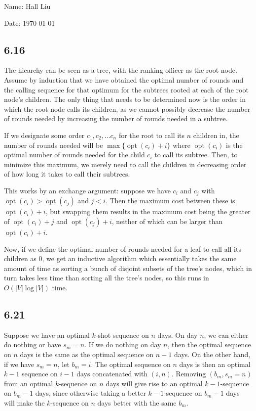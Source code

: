 \documentclass{article}
\DeclareMathOperator{\opt}{opt}
\begin{document}
Name: Hall Liu

Date: \today 
\vspace{1.5cm}
\subsection*{6.16}
The hiearchy can be seen as a tree, with the ranking officer as the root node. Assume by induction that we have obtained the optimal number of rounds and the calling sequence for that optimum for the subtrees rooted at each of the root node's children. The only thing that needs to be determined now is the order in which the root node calls its children, as we cannot possibly decrease the number of rounds needed by increasing the number of rounds needed in a subtree. 

If we designate some order $c_1,c_2,\ldots c_n$ for the root to call its $n$ children in, the number of rounds needed will be $\max\{\opt(c_i)+i\}$ where $\opt(c_i)$ is the optimal number of rounds needed for the child $c_i$ to call its subtree. Then, to minimize this maximum, we merely need to call the children in decreasing order of how long it takes to call their subtrees. 

This works by an exchange argument: suppose we have $c_i$ and $c_j$ with $\opt(c_i)>\opt(c_j)$ and $j<i$. Then the maximum cost between these is $\opt(c_i)+i$, but swapping them results in the maximum cost being the greater of $\opt(c_i)+j$ and $\opt(c_j)+i$, neither of which can be larger than $\opt(c_i)+i$.

Now, if we define the optimal number of rounds needed for a leaf to call all its children as $0$, we get an inductive algorithm which essentially takes the same amount of time as sorting a bunch of disjoint subsets of the tree's nodes, which in turn takes less time than sorting all the tree's nodes, so this runs in $O(|V|\log|V|)$ time.
\subsection*{6.21}
Suppose we have an optimal $k$-shot sequence on $n$ days. On day $n$, we can either do nothing or have $s_m=n$. If we do nothing on day $n$, then the optimal sequence on $n$ days is the same as the optimal sequence on $n-1$ days. On the other hand, if we have $s_m=n$, let $b_m=i$. The optimal sequence on $n$ days is then an optimal $k-1$ sequence on $i-1$ days concatenated with $(i,n)$. Removing $(b_m,s_m=n)$ from an optimal $k$-sequence on $n$ days will give rise to an optimal $k-1$-sequence on $b_m-1$ days, since otherwise taking a better $k-1$-sequence on $b_m-1$ days will make the $k$-sequence on $n$ days better with the same $b_m$.
\end{document}
